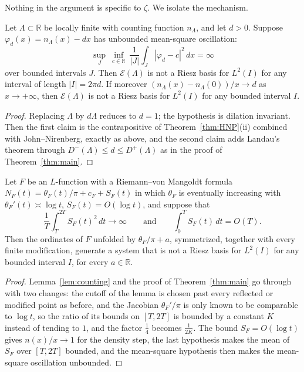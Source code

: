 \documentclass[11pt]{article}
\newcommand{\R}{\mathbb{R}}
\newcommand{\Lam}{\Lambda}
\newcommand{\E}{\mathcal{E}}
\begin{document}
Nothing in the argument is specific to $\zeta$. We isolate the mechanism.

\begin{theorem}\label{thm:general}
Let $\Lam\subset\R$ be locally finite with counting function $n_\Lam$, and let $d>0$. Suppose $\varphi_d(x)=n_\Lam(x)-dx$ has unbounded mean-square oscillation:
\[
\sup_J\ \inf_{c\in\R}\ \frac1{|J|}\int_J|\varphi_d-c|^2\,dx=\infty
\]
over bounded intervals $J$. Then $\E(\Lam)$ is not a Riesz basis for $L^2(I)$ for any interval of length $|I|=2\pi d$. If moreover $(n_\Lam(x)-n_\Lam(0))/x\to d$ as $x\to+\infty$, then $\E(\Lam)$ is not a Riesz basis for $L^2(I)$ for any bounded interval $I$.
\end{theorem}

\begin{proof}
Replacing $\Lam$ by $d\Lam$ reduces to $d=1$; the hypothesis is dilation invariant. Then the first claim is the contrapositive of Theorem~\ref{thm:HNP}(ii) combined with John--Nirenberg, exactly as above, and the second claim adds Landau's theorem through $D^-(\Lam)\le d\le D^+(\Lam)$ as in the proof of Theorem~\ref{thm:main}.
\end{proof}

\begin{corollary}\label{cor:L}
Let $F$ be an $L$-function with a Riemann--von Mangoldt formula $N_F(t)=\theta_F(t)/\pi+c_F+S_F(t)$ in which $\theta_F$ is eventually increasing with $\theta_F'(t)\asymp\log t$, $S_F(t)=O(\log t)$, and suppose that
\[
\frac1T\int_T^{2T}S_F(t)^2\,dt\to\infty\qquad\text{and}\qquad\int_0^TS_F(t)\,dt=O(T).
\]
Then the ordinates of $F$ unfolded by $\theta_F/\pi+a$, symmetrized, together with every finite modification, generate a system that is not a Riesz basis for $L^2(I)$ for any bounded interval $I$, for every $a\in\R$.
\end{corollary}

\begin{proof}
Lemma~\ref{lem:counting} and the proof of Theorem~\ref{thm:main} go through with two changes: the cutoff of the lemma is chosen past every reflected or modified point as before, and the Jacobian $\theta_F'/\pi$ is only known to be comparable to $\log t$, so the ratio of its bounds on $[T,2T]$ is bounded by a constant $K$ instead of tending to $1$, and the factor $\frac14$ becomes $\frac1{2K}$. The bound $S_F=O(\log t)$ gives $n(x)/x\to1$ for the density step, the last hypothesis makes the mean of $S_F$ over $[T,2T]$ bounded, and the mean-square hypothesis then makes the mean-square oscillation unbounded.
\end{proof}
\end{document}
